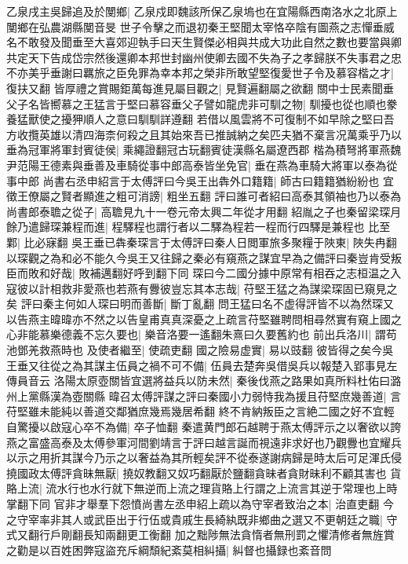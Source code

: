 乙泉戌主吳歸追及於閺鄉|{
	乙泉戍即魏該所保乙泉塢也在宜陽縣西南洛水之北原上閺鄉在弘農湖縣閺音旻}
世子令擊之而退初秦王堅聞太宰恪卒陰有圖燕之志憚垂威名不敢發及聞垂至大喜郊迎執手曰天生賢傑必相與共成大功此自然之數也要當與卿共定天下告成岱宗然後還卿本邦世封幽州使卿去國不失為子之孝歸朕不失事君之忠不亦美乎垂謝曰羈旅之臣免罪為幸本邦之榮非所敢望堅復愛世子令及慕容楷之才|{
	復扶又翻}
皆厚禮之賞賜鉅萬每進見屬目觀之|{
	見賢遍翻屬之欲翻}
關中士民素聞垂父子名皆嚮慕之王猛言于堅曰慕容垂父子譬如龍虎非可馴之物|{
	馴擾也從也順也豢養猛獸使之擾狎順人之意曰馴馴詳遵翻}
若借以風雲將不可復制不如早除之堅曰吾方收攬英雄以清四海柰何殺之且其始來吾已推誠納之矣匹夫猶不棄言况萬乘乎乃以垂為冠軍將軍封賓徒侯|{
	乘繩證翻冠古玩翻賓徒漢縣名屬遼西郡}
楷為積弩將軍燕魏尹范陽王德素與垂善及車騎從事中郎高泰皆坐免官|{
	垂在燕為車騎大將軍以泰為從事中郎}
尚書右丞申紹言于太傅評曰今吳王出犇外口籍籍|{
	師古曰籍籍猶紛紛也}
宜徵王僚屬之賢者顯進之粗可消謗|{
	粗坐五翻}
評曰誰可者紹曰高泰其領袖也乃以泰為尚書郎泰聸之從子|{
	高聸見九十一卷元帝太興二年從才用翻}
紹胤之子也秦留梁琛月餘乃遣歸琛兼程而進|{
	程驛程也謂行者以二驛為程若一程而行四驛是兼程也}
比至鄴|{
	比必寐翻}
吳王垂已犇秦琛言于太傅評曰秦人日閲軍旅多聚糧于陜東|{
	陜失冉翻}
以琛觀之為和必不能久今吳王又往歸之秦必有窺燕之謀宜早為之備評曰秦豈肯受叛臣而敗和好哉|{
	敗補邁翻好呼到翻下同}
琛曰今二國分據中原常有相吞之志桓温之入寇彼以計相救非愛燕也若燕有釁彼豈忘其本志哉|{
	苻堅王猛之為謀梁琛固已窺見之矣}
評曰秦主何如人琛曰明而善斷|{
	斷丁亂翻}
問王猛曰名不虚得評皆不以為然琛又以告燕主暐暐亦不然之以告皇甫真真深憂之上疏言苻堅雖聘問相尋然實有窺上國之心非能慕樂德義不忘久要也|{
	樂音洛要一遙翻朱熹曰久要舊約也}
前出兵洛川|{
	謂苟池鄧羌救燕時也}
及使者繼至|{
	使疏吏翻}
國之險易虚實|{
	易以豉翻}
彼皆得之矣今吳王垂又往從之為其謀主伍員之禍不可不備|{
	伍員去楚奔吳借吳兵以報楚入郢事見左傳員音云}
洛陽太原壺關皆宜選將益兵以防未然|{
	秦後伐燕之路果如真所料杜佑曰潞州上黨縣漢為壺關縣}
暐召太傅評謀之評曰秦國小力弱恃我為援且苻堅庶幾善道|{
	言苻堅雖未能純以善道交鄰猶庶幾焉幾居希翻}
終不肯納叛臣之言絶二國之好不宜輕自驚擾以啟寇心卒不為備|{
	卒子恤翻}
秦遣黄門郎石越聘于燕太傅評示之以奢欲以誇燕之富盛高泰及太傅參軍河間劉靖言于評曰越言誕而視遠非求好也乃觀釁也宜耀兵以示之用折其謀今乃示之以奢益為其所輕矣評不從泰遂謝病歸是時太后可足渾氏侵撓國政太傅評貪昧無厭|{
	撓奴教翻又奴巧翻厭於鹽翻貪昧者貪財昧利不顧其害也}
貨賂上流|{
	流水行也水行就下無逆而上流之理貨賂上行謂之上流言其逆于常理也上時掌翻下同}
官非才舉羣下怨憤尚書左丞申紹上疏以為守宰者致治之本|{
	治直吏翻}
今之守宰率非其人或武臣出于行伍或貴戚生長綺紈既非鄉曲之選又不更朝廷之職|{
	守式又翻行戶剛翻長知兩翻更工衡翻}
加之黜陟無法貪惰者無刑罰之懼清修者無旌賞之勸是以百姓困弊寇盜充斥綱頹紀紊莫相糾攝|{
	糾督也攝録也紊音問}
